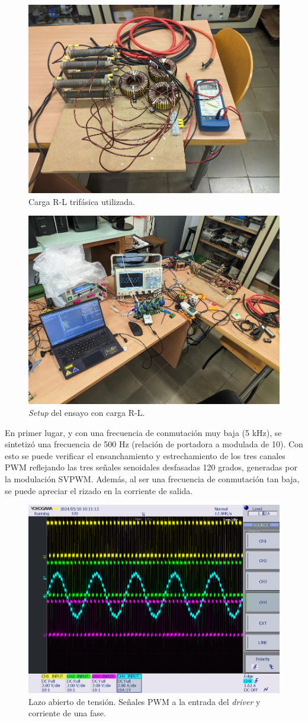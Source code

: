 \begin{figure}[H]
	\centering
	\includegraphics[width=0.7\linewidth]{fig/3RL-load}
	\caption{Carga R-L trifásica utilizada.}
\end{figure}

\begin{figure}[H]
	\centering
	\includegraphics[width=0.7\linewidth]{fig/3RL-setup}
	\caption{\textit{Setup} del ensayo con carga R-L.}
\end{figure}

En primer lugar, y con una frecuencia de conmutación muy baja (5 kHz), se sintetizó una frecuencia de 500 Hz (relación de portadora a modulada de 10). Con esto se puede verificar el ensanchamiento y estrechamiento de los tres canales PWM reflejando las tres señales senoidales desfasadas 120 grados, generadas por la modulación SVPWM. Además, al ser una frecuencia de conmutación tan baja, se puede apreciar el rizado en la corriente de salida.

\begin{figure}[H]
	\centering
	\includegraphics[width=0.7\linewidth]{fig/3RL-PWM}
	\caption{Lazo abierto de tensión. Señales PWM a la entrada del \textit{driver} y corriente de una fase.}
\end{figure}

